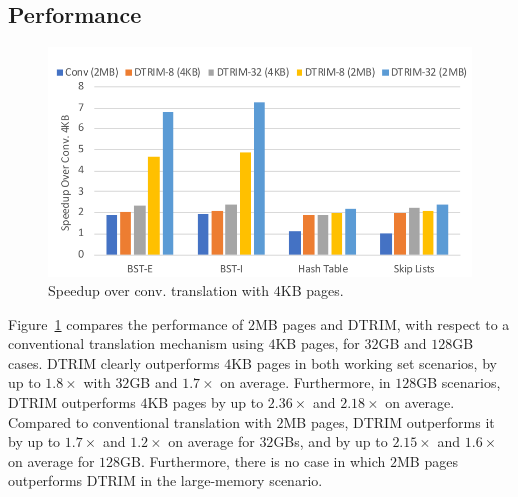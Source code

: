 \subsection{Performance}

\begin{figure}[t]
	\centering
	\includegraphics[width=1.0\columnwidth]{graphs/speedup.pdf}
	\caption{Speedup over conv. translation with  $4$KB pages.}
	\label{fig:perf}
\end{figure}


Figure~\ref{fig:perf} compares the performance of $2$MB pages and DTRIM, with respect to a conventional translation mechanism using $4$KB pages, for $32$GB and $128$GB cases. DTRIM clearly outperforms $4$KB pages in both working set scenarios, by up to $1.8\times$ with $32$GB and $1.7\times$ on average. Furthermore, in $128$GB scenarios, DTRIM outperforms $4$KB pages by up to $2.36\times$ and $2.18\times$ on average. Compared to conventional translation with $2$MB pages, DTRIM outperforms it by up to $1.7\times$ and $1.2\times$ on average for $32$GBs, and by up to $2.15\times$ and $1.6\times$ on average for $128$GB. Furthermore, there is no case in which $2$MB pages outperforms DTRIM in the large-memory scenario.

